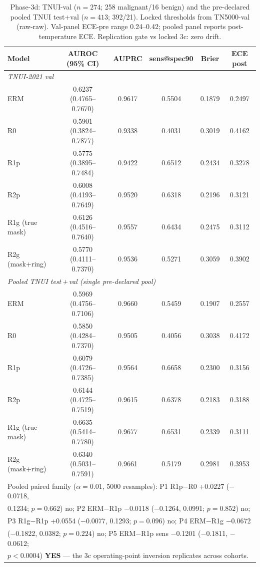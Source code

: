 \documentclass[11pt]{article}
\begin{document}
\begin{table}[!ht]
\centering\scriptsize
\setlength{\tabcolsep}{3pt}
\caption{Phase-3d: TNUI-val ($n{=}274$; 258 malignant/16 benign) and the
pre-declared pooled TNUI test+val ($n{=}413$; 392/21). Locked thresholds from
TN5000-val (raw-raw). Val-panel ECE-pre range 0.24--0.42; pooled panel reports
post-temperature ECE. Replication gate vs locked 3c: zero drift.}
\label{tab:phase3d}
\begin{tabular}{lccccc}
\toprule
Model & AUROC (95\% CI) & AUPRC & sens@spec90 & Brier & ECE post \\
\midrule
\multicolumn{6}{l}{\emph{TNUI-2021 val}}\\
ERM  & 0.6237 (0.4765--0.7670) & 0.9617 & 0.5504 & 0.1879 & 0.2497 \\
R0   & 0.5901 (0.3824--0.7877) & 0.9338 & 0.4031 & 0.3019 & 0.4162 \\
R1p  & 0.5775 (0.3895--0.7484) & 0.9422 & 0.6512 & 0.2434 & 0.3278 \\
R2p  & 0.6008 (0.4193--0.7649) & 0.9520 & 0.6318 & 0.2196 & 0.3121 \\
R1g (true mask)  & 0.6126 (0.4516--0.7640) & 0.9557 & 0.6434 & 0.2475 & 0.3112 \\
R2g (mask+ring)  & 0.5770 (0.4111--0.7370) & 0.9536 & 0.5271 & 0.3059 & 0.3902 \\
\midrule
\multicolumn{6}{l}{\emph{Pooled TNUI test\,+\,val (single pre-declared pool)}}\\
ERM  & 0.5969 (0.4756--0.7106) & 0.9660 & 0.5459 & 0.1907 & 0.2557 \\
R0   & 0.5850 (0.4284--0.7370) & 0.9505 & 0.4056 & 0.3038 & 0.4172 \\
R1p  & 0.6079 (0.4726--0.7385) & 0.9564 & 0.6658 & 0.2300 & 0.3156 \\
R2p  & 0.6144 (0.4725--0.7519) & 0.9615 & 0.6378 & 0.2183 & 0.3188 \\
R1g (true mask)  & 0.6635 (0.5414--0.7780) & 0.9677 & 0.6531 & 0.2339 & 0.3111 \\
R2g (mask+ring)  & 0.6340 (0.5031--0.7591) & 0.9661 & 0.5179 & 0.2981 & 0.3953 \\
\midrule
\multicolumn{6}{l}{Pooled paired family ($\alpha{=}0.01$, 5000 resamples): P1 R1p$-$R0 +0.0227 ($-$0.0718,}\\
\multicolumn{6}{l}{0.1234; $p{=}0.662$) no; P2 ERM$-$R1p $-$0.0118 ($-$0.1264, 0.0991; $p{=}0.852$) no;}\\
\multicolumn{6}{l}{P3 R1g$-$R1p +0.0554 ($-$0.0077, 0.1293; $p{=}0.096$) no; P4 ERM$-$R1g $-$0.0672}\\
\multicolumn{6}{l}{($-$0.1822, 0.0382; $p{=}0.224$) no; P5 ERM$-$R1p sens $-$0.1201 ($-$0.1811, $-$0.0612;}\\
\multicolumn{6}{l}{$p{<}0.0004$) \textbf{YES} --- the 3c operating-point inversion replicates across cohorts.}
\end{tabular}
\end{table}
\end{document}
